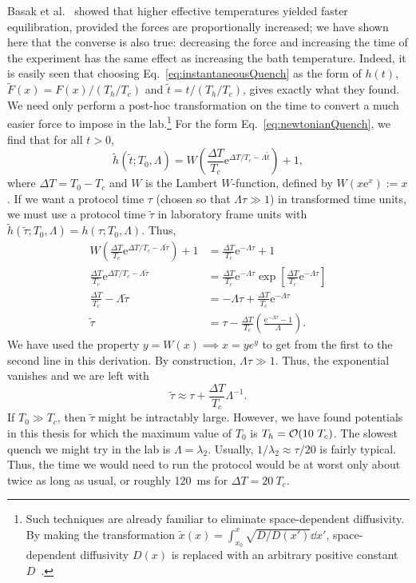 \documentclass[hyperref={colorlinks=true, urlcolor=blue, citecolor=blue, final, bound}]{sfuthesis}
\newcommand{\e}{\mathrm{e}}
\begin{document}
Basak et al.~\cite{Basak2026} showed that higher effective temperatures yielded faster equilibration, provided the forces are proportionally increased; we have shown here that the converse is also true: decreasing the force and increasing the time of the experiment has the same effect as increasing the bath temperature. Indeed, it is easily seen that choosing Eq.~\ref{eq:instantaneousQuench} as the form of $h(t)$, $\tilde F(x)=F(x)/(T_h/T_c)$ and $\tilde t = t/(T_h/T_c)$, gives exactly what they found. We need only perform a post-hoc transformation on the time to convert a much easier force to impose in the lab.\footnote{Such techniques are already familiar to eliminate space-dependent diffusivity. By making the transformation $\tilde x(x)=\int_{x_0}^x \sqrt{D/D(x')}\dd{x'}$, space-dependent diffusivity $D(x)$ is replaced with an arbitrary positive constant $D$~\cite{Risken1996}.} For the form Eq.~\ref{eq:newtonianQuench}, we find that for all $t>0$, 
\begin{equation}
\tilde h(\tilde t; T_0, \Lambda) = W\left( \frac{\Delta T}{T_c} \e^{\Delta T/T_c-\Lambda\tilde t}\right)+1,
\end{equation}
where $\Delta T=T_0-T_c$ and $W$ is the Lambert $W$-function, defined by $W(x\e^x):=x$. If we want a protocol time $\tau$ (chosen so that $\Lambda\tau \gg 1$) in transformed time units, we must use a protocol time $\tilde\tau$ in laboratory frame units with $\tilde h(\tilde \tau; T_0, \Lambda)=h(\tau; T_0, \Lambda)$. Thus,
\begin{align}
    W\left( \frac{\Delta T}{T_c} \e^{\Delta T/T_c-\Lambda\tilde\tau}\right)+1 &= \frac{\Delta T}{T_c} \e^{-\Lambda\tau}+1\\
    \frac{\Delta T}{T_c} \e^{\Delta T/T_c-\Lambda\tilde\tau} &= \frac{\Delta T}{T_c} \e^{-\Lambda\tau}\exp[\frac{\Delta T}{T_c} \e^{-\Lambda\tau}]\\
    \frac{\Delta T}{T_c}-\Lambda\tilde\tau &= -\Lambda\tau+\frac{\Delta T}{T_c} \e^{-\Lambda\tau}\\
    \tilde\tau &= \tau-\frac{\Delta T}{T_c}\left( \frac{\e^{-\Lambda\tau}-1}{\Lambda} \right).
\end{align}
We have used the property $y=W(x) \implies x=ye^y$ to get from the first to the second line in this derivation.
By construction, $\Lambda\tau\gg 1$. Thus, the exponential vanishes and we are left with
\begin{equation}
    \tilde\tau \approx \tau+\frac{\Delta T}{T_c}\Lambda^{-1}.
\end{equation}
If $T_0\gg T_c$, then $\tilde\tau$ might be intractably large. However, we have found potentials in this thesis for which the maximum value of $T_0$ is $T_h=\order{10~T_c}$. The slowest quench we might try in the lab is $\Lambda=\lambda_2$. Usually, $1/\lambda_2\approx\tau/20$ is fairly typical. Thus, the time we would need to run the protocol would be at worst only about twice as long as usual, or roughly \qty{120}{\milli\second} for $\Delta T=20~T_c$.
\end{document}
